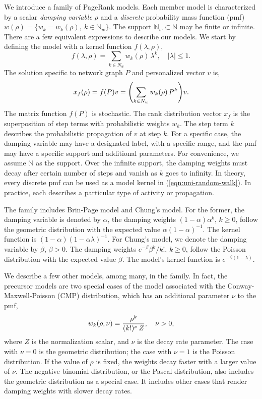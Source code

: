 \documentclass[conference]{IEEEtran}
\let\leftorig\left
\let\rightorig\right
\renewcommand{\left}{\mathopen{}\mathclose\bgroup\leftorig}
\renewcommand{\right}{\aftergroup\egroup\rightorig}
\begin{document}
We introduce a family of PageRank models.  
Each member model is characterized by a scalar \emph{damping
  variable} $\rho$ and a {\em discrete} probability mass function (pmf)
$ w(\rho) = \{ w_k=w_k(\rho), \ k \in \mathbb{N}_w \} $. The support
$ \mathbb{N}_{w} \subset \mathbb{N} $ may be finite or infinite.  There
are a few equivalent expressions to describe our models.
% 
We start by defining the model with a kernel function $f(\lambda, \rho)$, 
%
\begin{equation}
\label{eqn:uni-random-walk} 
f(\lambda, \rho) = \sum_{k \in N_w} w_k(\rho)\, \lambda^k, 
\quad | \lambda | \leq 1.   
\end{equation}%
%
The solution specific to network graph $P$ and personalized vector $v$ is, 
%
\begin{equation}
\label{eqn:uni-random-walk} 
x_f(\rho)   = f(P)v = \left(\sum_{k \in N_w} w_k(\rho)\, P^k \right) v . 
\end{equation}%
%
The matrix function $f(P)$ is stochastic. The rank
distribution vector $x_f$ is the superposition of step terms with
probabilistic weights $w_k$. The step term $k$ describes the
probabilistic propagation of $v$ at step $k$.
% 
For a specific case, the damping variable may have a designated label,
with a specific range, and the pmf may have a specific support and
additional parameters.  For convenience, we assume $\mathbb{N}$ as the
support. Over the infinite support, the damping weights must decay after
certain number of steps and vanish as $k$ goes to infinity. In theory, 
every discrete pmf can be used as a model kernel in (\ref{eqn:uni-random-walk}).
In practice, each describes a particular type of activity or propagation.
%

The family includes Brin-Page model and Chung's model.  For the former,
the damping variable is denoted by $\alpha$, the damping weights
$(1-\alpha)\alpha^k$, $k\geq 0$, follow the geometric distribution with
the expected value $\alpha(1-\alpha)^{-1}$. The kernel function
is $ (1-\alpha)(1-\alpha\lambda)^{-1}$.  For Chung's model, we
denote the damping variable by $\beta$, $\beta > 0$. The damping weights
$e^{-\beta}\beta^k/k!$, $k\geq 0$, follow the Poisson distribution with
the expected value $\beta$. The model's kernel function is
$e^{-\beta(1-\lambda)}$.

We describe a few other models, among many, in the family. In fact, the
precursor models are two special cases of the model associated with the
Conway-Maxwell-Poisson (CMP) distribution, which has an additional
parameter $\nu$ to the pmf,
% 
\begin{equation} 
\notag
\label{eqn:CMP-weights}
  w_k( \rho, \nu) 
= \frac{\rho^{k}}{(k!)^{\nu}\, Z}, 
 \quad \nu > 0, 
\end{equation}
%
where $Z$ is the normalization scalar, and $\nu$ is the decay
rate parameter. The case with $\nu=0$ is the geometric distribution; the
case with $\nu=1$ is the Poisson distribution. If the value of $\rho$ is
fixed, the weights decay faster with a larger value of $\nu$.
%
The negative binomial distribution, or the Pascal distribution, also
includes the geometric distribution as a special case. It includes
other cases that 
render damping weights with slower decay rates.
%
\end{document}
